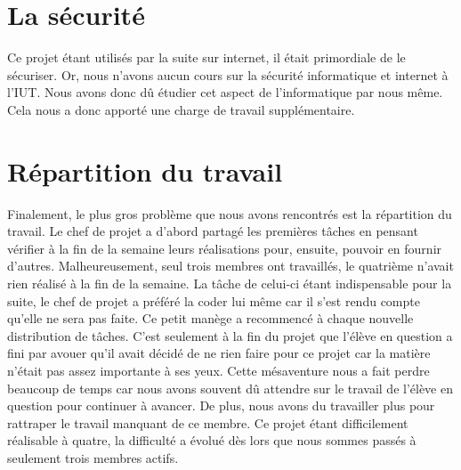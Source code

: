 \documentclass[11pt,a4paper,titlepage]{report}
\begin{document}
\section{La sécurité}
Ce projet étant utilisés par la suite sur internet, il était primordiale de le sécuriser. Or, nous n'avons aucun cours sur la sécurité informatique et internet à l'IUT. Nous avons donc dû étudier cet aspect de l'informatique par nous même. Cela nous a donc apporté une charge de travail supplémentaire.

\section{Répartition du travail}
Finalement, le plus gros problème que nous avons rencontrés est la répartition du travail. 
Le chef de projet a d'abord partagé les premières tâches en pensant vérifier à la fin de la semaine leurs réalisations pour, ensuite, pouvoir en fournir d'autres. Malheureusement, seul trois membres ont travaillés, le quatrième n'avait rien réalisé à la fin de la semaine. 
La tâche de celui-ci étant indispensable pour la suite, le chef de projet a préféré la coder lui même car il s'est rendu compte qu'elle ne sera pas faite.
Ce petit manège a recommencé à chaque nouvelle distribution de tâches. C'est seulement à la fin du projet que l'élève en question a fini par avouer qu'il avait décidé de ne rien faire pour ce projet car la matière n'était pas assez importante à ses yeux. Cette mésaventure nous a fait perdre beaucoup de temps car nous avons souvent dû attendre sur le travail de l'élève en question pour continuer à avancer. De plus, nous avons du travailler plus pour rattraper le travail manquant de ce membre.
Ce projet étant difficilement réalisable à quatre, la difficulté a évolué dès lors que nous sommes passés à seulement trois membres actifs. 
\end{document}
